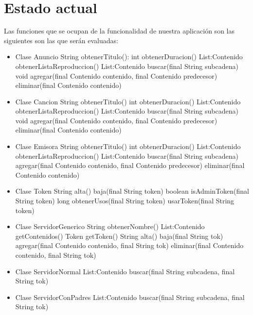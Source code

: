 \documentclass[12pt, a4paper, titlepage]{article}
\begin{document}
	\newpage
	
	\section{Estado actual}
	
	Las funciones que se ocupan de la funcionalidad de nuestra aplicación son las siguientes son las que serán evaluadas:
		\begin{itemize}
			\item Clase Anuncio
				\subitem String obtenerTitulo(): 
				\subitem int obtenerDuracion()
				\subitem List:Contenido obtenerListaReproduccion()
				\subitem List:Contenido buscar(final String subcadena)
				\subitem	void agregar(final Contenido contenido, final Contenido predecesor)
				\subitem	eliminar(final Contenido contenido)
			\item Clase Cancion
				\subitem String obtenerTitulo()
				\subitem int obtenerDuracion()
				\subitem List:Contenido obtenerListaReproduccion()
				\subitem List:Contenido buscar(final String subcadena)
				\subitem	void agregar(final Contenido contenido, final Contenido predecesor)
				\subitem	eliminar(final Contenido contenido)
			\item Clase Emisora
				\subitem String obtenerTitulo()
				\subitem int obtenerDuracion()
				\subitem List:Contenido obtenerListaReproduccion()
				\subitem List:Contenido buscar(final String subcadena)
				\subitem agregar(final Contenido contenido, final Contenido predecesor)
				\subitem eliminar(final Contenido contenido)
			\item Clase Token
				\subitem String alta()
				\subitem baja(final String token)
				\subitem boolean isAdminToken(final String token)
				\subitem long obtenerUsos(final String token)
				\subitem usarToken(final String token)
			\item Clase ServidorGenerico
				\subitem String obtenerNombre()
				\subitem List:Contenido getContenidos()
				\subitem Token getToken()
				\subitem String alta()
				\subitem baja(final String tok)
				\subitem agregar(final Contenido contenido, final String tok)
				\subitem eliminar(final Contenido contenido, final String tok)
			\item Clase ServidorNormal
				\subitem List:Contenido buscar(final String subcadena, final String tok)
			\item Clase ServidorConPadres
				\subitem List:Contenido buscar(final String subcadena, final String tok)
		\end{itemize}
	
\end{document}
